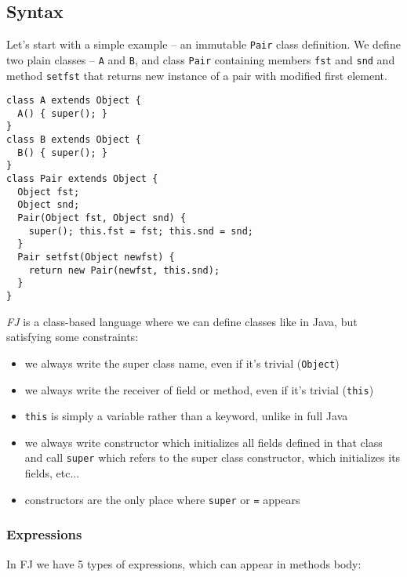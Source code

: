 \documentclass{article}[12pt]
\begin{document}
\subsection{Syntax}

Let's start with a simple example -- an immutable \texttt{Pair} class
definition. We define two plain classes -- \texttt{A} and \texttt{B},
and class \texttt{Pair} containing members \texttt{fst} and \texttt{snd}
and method \texttt{setfst} that returns new instance of a
pair with modified first element.

\begin{verbatim}
class A extends Object {
  A() { super(); }
}
class B extends Object {
  B() { super(); }
}
class Pair extends Object {
  Object fst;
  Object snd;
  Pair(Object fst, Object snd) {
    super(); this.fst = fst; this.snd = snd;
  }
  Pair setfst(Object newfst) {
    return new Pair(newfst, this.snd);
  }
}
\end{verbatim}

\emph{FJ} is a class-based language where we can define classes like in
Java, but satisfying some constraints:

\begin{itemize}
\item we always write the super class name, even if it's trivial
  (\texttt{Object})
\item we always write the receiver of field or method, even if it's
  trivial (\texttt{this})
\item \texttt{this} is simply a variable rather than a keyword, unlike
  in full Java
\item we always write constructor which initializes all fields
  defined in that class and call \texttt{super} which refers to the
  super class constructor, which initializes its fields, etc...
\item constructors are the only place where \texttt{super} or
  \texttt{=} appears
\end{itemize}

\subsubsection{Expressions}

In FJ we have 5 types of expressions, which can appear in methods body:
\end{document}
